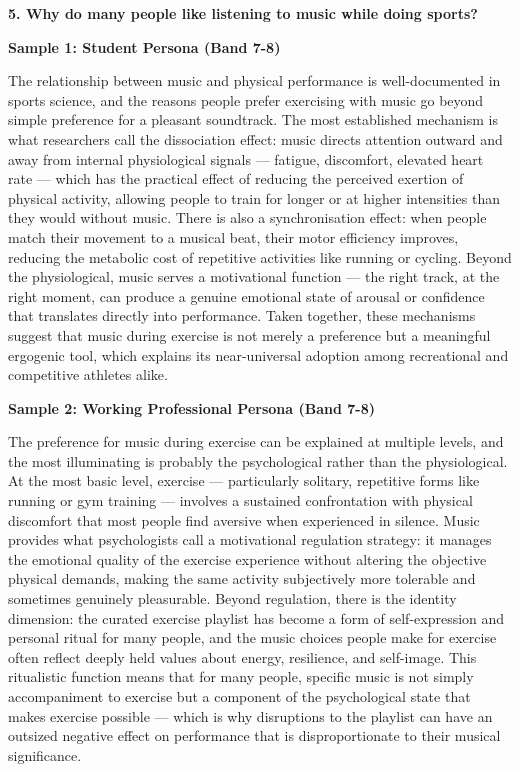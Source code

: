 \separator

\begin{ieltsquestion}
\textbf{5. Why do many people like listening to music while doing sports?}
\end{ieltsquestion}
\textbf{Sample 1: Student Persona (Band 7-8)}

The relationship between music and physical performance is well-documented in sports science, and the reasons people prefer exercising with music go beyond simple preference for a pleasant soundtrack. The most established mechanism is what researchers call the dissociation effect: music directs attention outward and away from internal physiological signals — fatigue, discomfort, elevated heart rate — which has the practical effect of reducing the perceived exertion of physical activity, allowing people to train for longer or at higher intensities than they would without music. There is also a synchronisation effect: when people match their movement to a musical beat, their motor efficiency improves, reducing the metabolic cost of repetitive activities like running or cycling. Beyond the physiological, music serves a motivational function — the right track, at the right moment, can produce a genuine emotional state of arousal or confidence that translates directly into performance. Taken together, these mechanisms suggest that music during exercise is not merely a preference but a meaningful ergogenic tool, which explains its near-universal adoption among recreational and competitive athletes alike.

\textbf{Sample 2: Working Professional Persona (Band 7-8)}

The preference for music during exercise can be explained at multiple levels, and the most illuminating is probably the psychological rather than the physiological. At the most basic level, exercise — particularly solitary, repetitive forms like running or gym training — involves a sustained confrontation with physical discomfort that most people find aversive when experienced in silence. Music provides what psychologists call a motivational regulation strategy: it manages the emotional quality of the exercise experience without altering the objective physical demands, making the same activity subjectively more tolerable and sometimes genuinely pleasurable. Beyond regulation, there is the identity dimension: the curated exercise playlist has become a form of self-expression and personal ritual for many people, and the music choices people make for exercise often reflect deeply held values about energy, resilience, and self-image. This ritualistic function means that for many people, specific music is not simply accompaniment to exercise but a component of the psychological state that makes exercise possible — which is why disruptions to the playlist can have an outsized negative effect on performance that is disproportionate to their musical significance.

